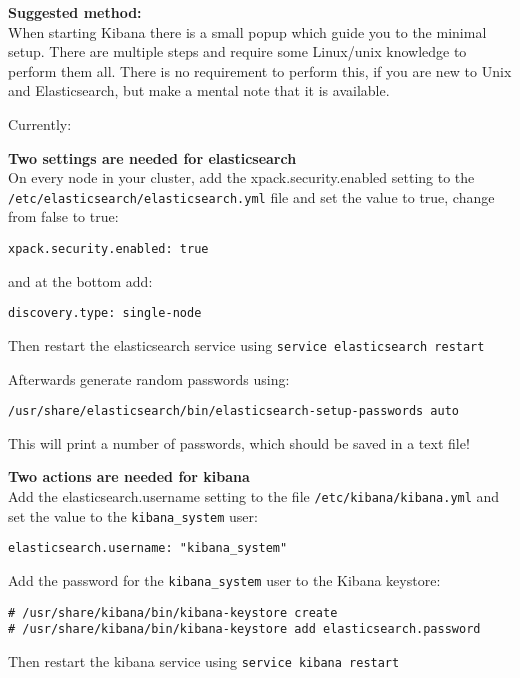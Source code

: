 \documentclass[a4paper,11pt,notitlepage]{report}
\begin{document}
{\bf Suggested method:}\\
When starting Kibana there is a small popup which guide you to the minimal setup. There are multiple steps and require some Linux/unix knowledge to perform them all. There is no requirement to perform this, if you are new to Unix and Elasticsearch, but make a mental note that it is available.

Currently:\\

{\bf Two settings are needed for elasticsearch}\\
On every node in your cluster, add the xpack.security.enabled setting to the
\verb+/etc/elasticsearch/elasticsearch.yml+ file and set the value to true, change from false to true:

\begin{verbatim}
xpack.security.enabled: true
\end{verbatim}

and at the bottom add:

\begin{verbatim}
discovery.type: single-node
\end{verbatim}

Then restart the elasticsearch service using \verb+service elasticsearch restart+

Afterwards generate random passwords using:

\begin{verbatim}
/usr/share/elasticsearch/bin/elasticsearch-setup-passwords auto
\end{verbatim}

This will print a number of passwords, which should be saved in a text file!


{\bf Two actions are needed for kibana}\\
Add the elasticsearch.username setting to the file \verb+/etc/kibana/kibana.yml+ and set the value to the \verb+kibana_system+ user:

\begin{verbatim}
elasticsearch.username: "kibana_system"
\end{verbatim}




Add the password for the \verb+kibana_system+ user to the Kibana keystore:
\begin{verbatim}
# /usr/share/kibana/bin/kibana-keystore create
# /usr/share/kibana/bin/kibana-keystore add elasticsearch.password
\end{verbatim}
Then restart the kibana service using \verb+service kibana restart+
\end{document}
